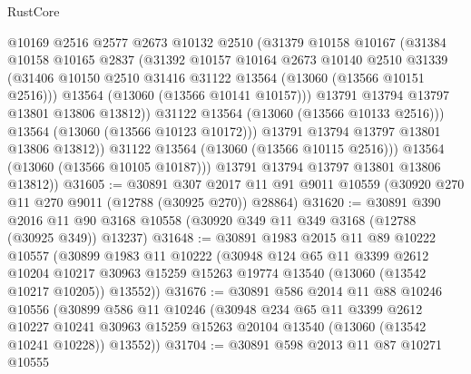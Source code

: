 \begin{lexlean}{RustCore}
\begin{coremodule}
                    @10169
                    @2516
                    @2577
                    @2673
                    @10132
                    @2510
                    (@31379
                      @10158
                      @10167
                      (@31384
                        @10158
                        @10165
                        @2837
                        (@31392
                          @10157
                          @10164
                          @2673
                          @10140
                          @2510
                          @31339
                          (@31406 @10150 @2510 @31416 @31122 @13564 (@13060 (@13566 @10151 @2516)))
                          @13564
                          (@13060 (@13566 @10141 @10157)))
                        @13791
                        @13794
                        @13797
                        @13801
                        @13806
                        @13812))
                    @31122
                    @13564
                    (@13060 (@13566 @10133 @2516)))
                  @13564
                  (@13060 (@13566 @10123 @10172)))
                @13791
                @13794
                @13797
                @13801
                @13806
                @13812))
            @31122
            @13564
            (@13060 (@13566 @10115 @2516)))
          @13564
          (@13060 (@13566 @10105 @10187)))
        @13791
        @13794
        @13797
        @13801
        @13806
        @13812))
@31605 := @30891
    @307
    @2017
    @11
    @91
    @9011
    @10559
    (@30920 @270 @11 @270 @9011 (@12788 (@30925 @270)) @28864)
@31620 := @30891
    @390
    @2016
    @11
    @90
    @3168
    @10558
    (@30920 @349 @11 @349 @3168 (@12788 (@30925 @349)) @13237)
@31648 := @30891
    @1983
    @2015
    @11
    @89
    @10222
    @10557
    (@30899
      @1983
      @11
      @10222
      (@30948
        @124
        @65
        @11
        @3399
        @2612
        @10204
        @10217
        @30963
        @15259
        @15263
        @19774
        @13540
        (@13060 (@13542 @10217 @10205))
        @13552))
@31676 := @30891
    @586
    @2014
    @11
    @88
    @10246
    @10556
    (@30899
      @586
      @11
      @10246
      (@30948
        @234
        @65
        @11
        @3399
        @2612
        @10227
        @10241
        @30963
        @15259
        @15263
        @20104
        @13540
        (@13060 (@13542 @10241 @10228))
        @13552))
@31704 := @30891
    @598
    @2013
    @11
    @87
    @10271
    @10555

\end{coremodule}
\end{lexlean}
